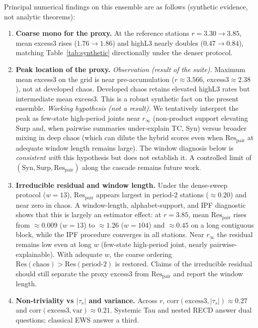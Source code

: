 \documentclass[11pt,a4paper]{article}
\begin{document}
Principal numerical findings on this ensemble are as follows
(synthetic evidence, not analytic theorems):
\begin{enumerate}[leftmargin=*,itemsep=2pt]
  \item \textbf{Coarse mono for the proxy.}
  At the reference stations $r=3.30\to 3.85$, mean excess3 rises
  ($1.76\to 1.86$) and highL3 nearly doubles ($0.47\to 0.84$), matching
  Table~\ref{tab:synthetic} directionally under the denser protocol.
  \item \textbf{Peak location of the proxy.}
  \emph{Observation (result of the suite).} Maximum mean excess3 on the
  grid is near pre-accumulation ($r\approx 3.566$, excess3$\approx 2.38$),
  not at developed chaos. Developed chaos retains elevated highL3 rates
  but intermediate mean excess3. This is a robust synthetic fact on the
  present ensemble.
  \emph{Working hypothesis (not a result).} We tentatively interpret the
  peak as few-state high-period joints near $r_\infty$ (non-product
  support elevating Surp and, when pairwise summaries under-explain TC,
  Syn) versus broader mixing in deep chaos (which can dilute the hybrid
  scores even when $\mathrm{Res}_{\mathrm{pair}}$ at adequate window length
  remains large). The window diagnosis below is \emph{consistent with}
  this hypothesis but does not establish it. A controlled limit of
  $(\mathrm{Syn},\mathrm{Surp},\mathrm{Res}_{\mathrm{pair}})$ along the
  cascade remains future work.
  \item \textbf{Irreducible residual and window length.}
  Under the dense-sweep protocol ($w=13$), $\mathrm{Res}_{\mathrm{pair}}$
  appears largest in period-$2$ stations ($\approx 0.20$) and near zero
  in chaos. A window-length, alphabet-support, and IPF diagnostic shows
  that this is largely an estimator effect: at $r=3.85$, mean
  $\mathrm{Res}_{\mathrm{pair}}$ rises from $\approx 0.009$ ($w=13$) to
  $\approx 1.26$ ($w=104$) and $\approx 0.45$ on a long contiguous
  block, while the IPF procedure converges in all stations. Near
  $r_\infty$ the residual remains low even at long $w$ (few-state
  high-period joint, nearly pairwise-explainable). With adequate $w$,
  the coarse ordering
  $\mathrm{Res}(\mathrm{chaos})>\mathrm{Res}(\mathrm{period\text{-}2})$
  is restored. Claims of the irreducible residual should still separate
  the proxy excess3 from $\mathrm{Res}_{\mathrm{pair}}$ and report the
  window length.
  \item \textbf{Non-triviality vs $|\tau_s|$ and variance.}
  Across $r$, $\mathrm{corr}(\mathrm{excess3},|\tau_s|)\approx 0.27$ and
  $\mathrm{corr}(\mathrm{excess3},\mathrm{var})\approx 0.21$. Systemic Tau
  and nested RECD answer dual questions; classical EWS answer a third.
\end{enumerate}
\end{document}
